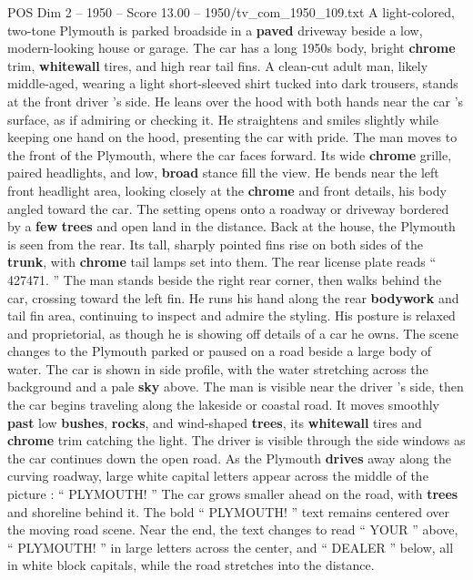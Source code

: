 \begin{textsample}{POS Dim 2 – 1950 – Score 13.00 – 1950/tv\_com\_1950\_109.txt}  \label{ex:f2_pos_085}
A light-colored, two-tone Plymouth is parked broadside in a \textbf{paved} driveway beside a low, modern-looking house or garage.
The car has a long 1950s body, bright \textbf{chrome} trim, \textbf{whitewall} tires, and high rear tail fins.
A clean-cut adult man, likely middle-aged, wearing a light short-sleeved shirt tucked into dark trousers, stands at the front driver ’s side.
He leans over the hood with both hands near the car ’s surface, as if admiring or checking it.
He straightens and smiles slightly while keeping one hand on the hood, presenting the car with pride.
The man moves to the front of the Plymouth, where the car faces forward.
Its wide \textbf{chrome} grille, paired headlights, and low, \textbf{broad} stance fill the view.
He bends near the left front headlight area, looking closely at the \textbf{chrome} and front details, his body angled toward the car.
The setting opens onto a roadway or driveway bordered by a \textbf{few} \textbf{trees} and open land in the distance.
Back at the house, the Plymouth is seen from the rear.
Its tall, sharply pointed fins rise on both sides of the \textbf{trunk}, with \textbf{chrome} tail lamps set into them.
The rear license plate reads “ 427471. ” The man stands beside the right rear corner, then walks behind the car, crossing toward the left fin.
He runs his hand along the rear \textbf{bodywork} and tail fin area, continuing to inspect and admire the styling.
His posture is relaxed and proprietorial, as though he is showing off details of a car he owns.
The scene changes to the Plymouth parked or paused on a road beside a large body of water.
The car is shown in side profile, with the water stretching across the background and a pale \textbf{sky} above.
The man is visible near the driver ’s side, then the car begins traveling along the lakeside or coastal road.
It moves smoothly \textbf{past} low \textbf{bushes}, \textbf{rocks}, and wind-shaped \textbf{trees}, its \textbf{whitewall} tires and \textbf{chrome} trim catching the light.
The driver is visible through the side windows as the car continues down the open road.
As the Plymouth \textbf{drives} away along the curving roadway, large white capital letters appear across the middle of the picture : “ PLYMOUTH! ” The car grows smaller ahead on the road, with \textbf{trees} and shoreline behind it.
The bold “ PLYMOUTH! ” text remains centered over the moving road scene.
Near the end, the text changes to read “ YOUR ” above, “ PLYMOUTH! ” in large letters across the center, and “ DEALER ” below, all in white block capitals, while the road stretches into the distance.

\end{textsample}
